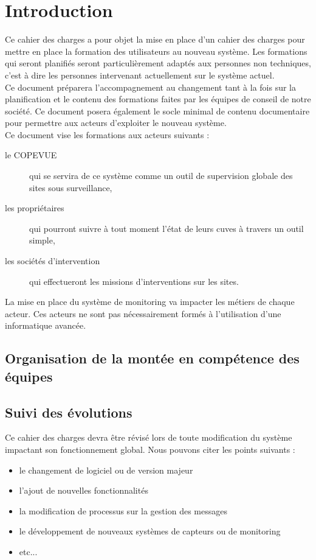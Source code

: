 \section{Introduction}


Ce cahier des charges a pour objet la mise en place d'un cahier des charges pour mettre en place la formation des utilisateurs au nouveau système. Les formations qui seront planifiés seront particulièrement adaptés aux personnes non techniques, c'est à dire les personnes intervenant actuellement sur le système actuel. \\

Ce document préparera l'accompagnement au changement tant à la fois sur la planification et le contenu des formations faites par les équipes de conseil de notre société. Ce document posera
également le socle minimal de contenu documentaire pour permettre aux acteurs d'exploiter le nouveau système. \\

Ce document vise les formations aux acteurs suivants : 
\begin{description}
\item[le COPEVUE] qui se servira de ce système comme un outil de supervision globale des sites sous surveillance,
\item[les propriétaires] qui pourront suivre à tout moment l'état de leurs cuves à travers un outil simple, 
\item[les sociétés d'intervention] qui effectueront les missions d'interventions sur les sites.
\end{description}

La mise en place du système de monitoring va impacter les métiers de chaque acteur. Ces acteurs ne sont pas nécessairement formés à l'utilisation d'une informatique avancée.

\subsection{Organisation de la montée en compétence des équipes}



\subsection{Suivi des évolutions}

Ce cahier des charges devra être révisé lors de toute modification du système impactant son fonctionnement global. Nous pouvons citer les points suivants :
\begin{itemize}
\item le changement de logiciel ou de version majeur
\item l'ajout de nouvelles fonctionnalités
\item la modification de processus sur la gestion des messages
\item le développement de nouveaux systèmes de capteurs ou de monitoring
\item etc...
\end{itemize}

